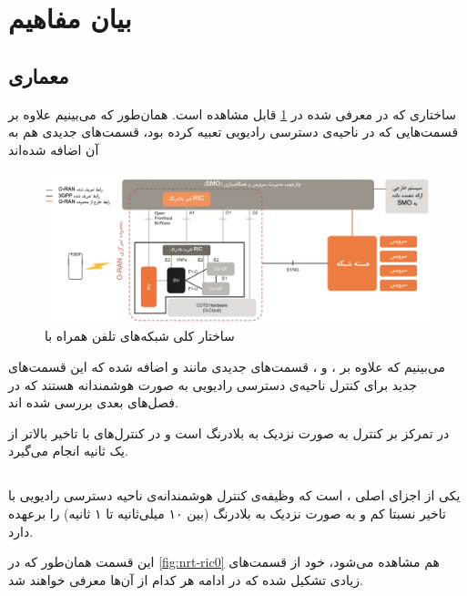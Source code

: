 \documentclass{CSICC}
\begin{document}
\section{بیان مفاهیم}

\subsection{معماری
}

ساختاری که در 
معرفی شده در 
\ref{fig:oran}
قابل مشاهده است. همان‌طور که می‌بینیم علاوه بر قسمت‌هایی که 
در ناحیه‌ی دسترسی رادیویی تعبیه کرده بود، قسمت‌های جدیدی هم به آن اضافه شده‌اند 

\begin{figure}
	\includegraphics[width=\linewidth]{Images/oran.png}
	\centering
	\caption{ساختار کلی شبکه‌های تلفن همراه با
		}
	\label{fig:oran}
\end{figure}

می‌بینیم که علاوه بر 
،
و 
،
قسمت‌های جدیدی مانند 
و 
اضافه شده که این قسمت‌های جدید برای کنترل ناحیه‌ی دسترسی رادیویی به صورت هوشمندانه هستند که در فصل‌های بعدی بررسی شده اند.

در 
تمرکز بر کنترل به صورت نزدیک به بلادرنگ است و در 
کنترل‌های با تاخیر بالاتر از یک ثانیه انجام می‌گیرد. 

\subsection{}

یکی از اجزای اصلی
،
است که وظیفه‌ی کنترل هوشمندانه‌ی ناحیه دسترسی رادیویی با تاخیر نسبتا کم و به صورت نزدیک به بلادرنگ (بین ۱۰ میلی‌ثانیه تا ۱ ثانیه) را برعهده دارد.

این قسمت همان‌طور که در 
\ref{fig:nrt-ric0}
هم مشاهده می‌شود، خود از قسمت‌های زیادی تشکیل شده که در ادامه هر کدام از آن‌ها معرفی خواهند شد.
\end{document}
